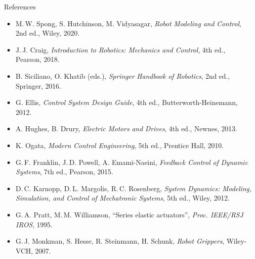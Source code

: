 \documentclass[aspectratio=169,10pt]{beamer}
\begin{document}
\begin{frame}{References}
\scriptsize
\begin{itemize}\setlength\itemsep{1pt}
\item M.\,W. Spong, S. Hutchinson, M. Vidyasagar, \textit{Robot Modeling and Control}, 2nd ed., Wiley, 2020.
\item J.\,J. Craig, \textit{Introduction to Robotics: Mechanics and Control}, 4th ed., Pearson, 2018.
\item B. Siciliano, O. Khatib (eds.), \textit{Springer Handbook of Robotics}, 2nd ed., Springer, 2016.
\item G. Ellis, \textit{Control System Design Guide}, 4th ed., Butterworth-Heinemann, 2012.
\item A. Hughes, B. Drury, \textit{Electric Motors and Drives}, 4th ed., Newnes, 2013.
\item K. Ogata, \textit{Modern Control Engineering}, 5th ed., Prentice Hall, 2010.
\item G.\,F. Franklin, J.\,D. Powell, A. Emami-Naeini, \textit{Feedback Control of Dynamic Systems}, 7th ed., Pearson, 2015.
\item D.\,C. Karnopp, D.\,L. Margolis, R.\,C. Rosenberg, \textit{System Dynamics: Modeling, Simulation, and Control of Mechatronic Systems}, 5th ed., Wiley, 2012.
\item G.\,A. Pratt, M.\,M. Williamson, ``Series elastic actuators'', \textit{Proc. IEEE/RSJ IROS}, 1995.
\item G.\,J. Monkman, S. Hesse, R. Steinmann, H. Schunk, \textit{Robot Grippers}, Wiley-VCH, 2007.
\end{itemize}
\end{frame}
\end{document}
